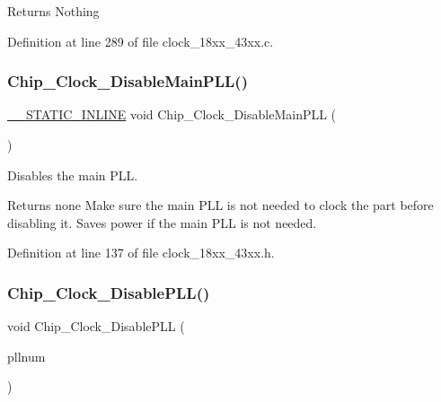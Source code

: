 \begin{DoxyReturn}{Returns}
Nothing 
\end{DoxyReturn}


Definition at line 289 of file clock\+\_\+18xx\+\_\+43xx.\+c.

\mbox{\label{group___c_l_o_c_k__18_x_x__43_x_x_ga752e7a9c291cb61877d9f00a2c9772a3}} 
\subsubsection{\texorpdfstring{Chip\+\_\+\+Clock\+\_\+\+Disable\+Main\+P\+L\+L()}{Chip\_Clock\_DisableMainPLL()}}
{\footnotesize\ttfamily \hyperlink{cmsis__iccarm_8h_aba87361bfad2ae52cfe2f40c1a1dbf9c}{\+\_\+\+\_\+\+S\+T\+A\+T\+I\+C\+\_\+\+I\+N\+L\+I\+NE} void Chip\+\_\+\+Clock\+\_\+\+Disable\+Main\+P\+LL (\begin{DoxyParamCaption}\item[{void}]{ }\end{DoxyParamCaption})}



Disables the main P\+LL. 

\begin{DoxyReturn}{Returns}
none Make sure the main P\+LL is not needed to clock the part before disabling it. Saves power if the main P\+LL is not needed. 
\end{DoxyReturn}


Definition at line 137 of file clock\+\_\+18xx\+\_\+43xx.\+h.

\mbox{\label{group___c_l_o_c_k__18_x_x__43_x_x_gaa9ce1d7461c0eeca2fe5b72528d9d81e}} 
\subsubsection{\texorpdfstring{Chip\+\_\+\+Clock\+\_\+\+Disable\+P\+L\+L()}{Chip\_Clock\_DisablePLL()}}
{\footnotesize\ttfamily void Chip\+\_\+\+Clock\+\_\+\+Disable\+P\+LL (\begin{DoxyParamCaption}\item[{\hyperlink{group___c_l_o_c_k__18_x_x__43_x_x_ga839a458a9e1e2a85e68470156c861e6a}{C\+H\+I\+P\+\_\+\+C\+G\+U\+\_\+\+U\+S\+B\+\_\+\+A\+U\+D\+I\+O\+\_\+\+P\+L\+L\+\_\+T}}]{pllnum }\end{DoxyParamCaption})}



